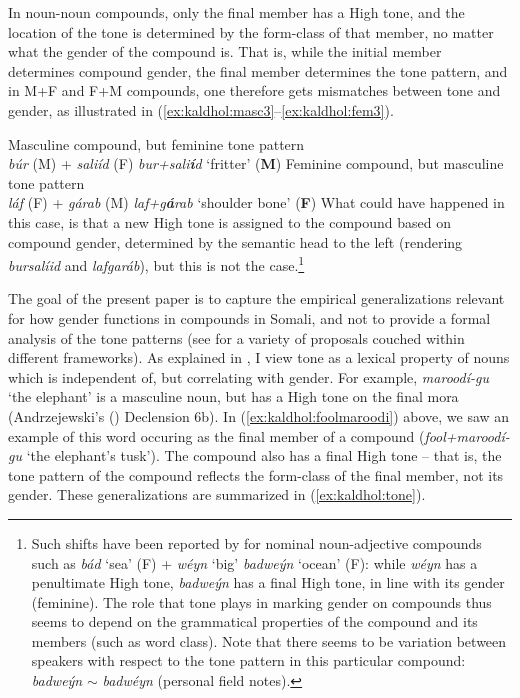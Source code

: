\documentclass[output=paper]{langscibook}
\begin{document}
In noun-noun compounds, only the final member has a High tone, and the location of the tone is determined by the form-class of that member, no matter what the gender of the compound is. That is, while the initial member determines compound gender, the final member determines the tone pattern, and in M+F and F+M compounds, one therefore gets mismatches between tone and gender, as illustrated in (\ref{ex:kaldhol:masc3}--\ref{ex:kaldhol:fem3}).

\ea\label{ex:kaldhol:masc3}
	Masculine compound, but feminine tone pattern\\
	\textit{búr} (M) + \textit{saliíd} (F) \pil \textit{bur+sali\textbf{í}d} `fritter' (\textbf{M})
\ex\label{ex:kaldhol:fem3}
	Feminine compound, but masculine tone pattern\\
	\textit{láf} (F) + \textit{gárab} (M) \pil \textit{laf+g\textbf{á}rab} `shoulder bone' (\textbf{F})
\z
What could have happened in this case, is that a new High tone is assigned to the compound based on compound gender, determined by the semantic head to the left (rendering \textit{bursalíid} and \textit{lafgaráb}), but this is not the case.\footnote{Such shifts have been reported by \textcite{Banti2016} for nominal noun-adjective compounds such as \textit{bád} `sea' (F) + \textit{wéyn} `big' \pil \textit{badwe\'yn} `ocean' (F): while \textit{wéyn} has a penultimate High tone, \textit{badweýn} has a final High tone, in line with its gender (feminine). The role that tone plays in marking gender on compounds thus seems to depend on the grammatical properties of the compound and its members (such as word class). Note that there seems to be variation between speakers with respect to the tone pattern in this particular compound: \textit{badweýn} $\sim$ \textit{badwéyn} (personal field notes).} 

The goal of the present paper is to capture the empirical generalizations relevant for how gender functions in compounds in Somali, and not to provide a formal analysis of the tone patterns (see \citealt{Hyman1981,Lampitelli2013,LeGac2016,Green2016,Downing2019} for a variety of proposals couched within different frameworks). As explained in , I view tone as a lexical property of nouns which is independent of, but correlating with gender. For example, \textit{maroodí-gu} `the elephant' is a masculine noun, but has a High tone on the final mora (Andrzejewski's (\citeyear{Andrzejewski1964}) Declension 6b). In (\ref{ex:kaldhol:foolmaroodi}) above, we saw an example of this word occuring as the final member of a compound (\textit{fool+maroodí-gu} `the elephant's tusk'). The compound also has a final High tone -- that is, the tone pattern of the compound reflects the form-class of the final member, not its gender. These generalizations are summarized in (\ref{ex:kaldhol:tone}).
\end{document}
